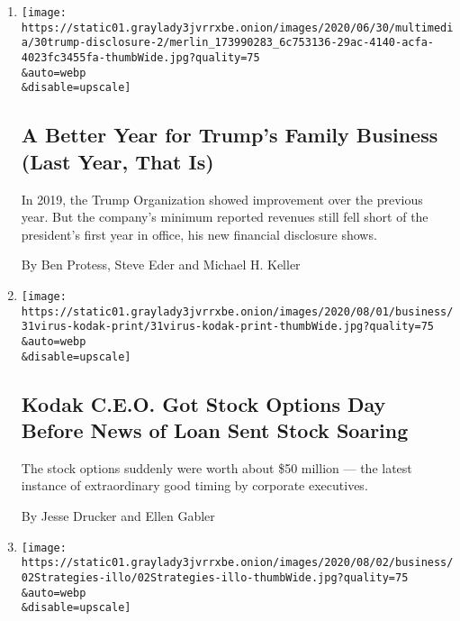 \begin{enumerate}
\def\labelenumi{\arabic{enumi}.}
\item
  \href{/2020/07/31/business/trump-financial-disclosure.html}{}

  \texttt{[image: https://static01.graylady3jvrrxbe.onion/images/2020/06/30/multimedia/30trump-disclosure-2/merlin\_173990283\_6c753136-29ac-4140-acfa-4023fc3455fa-thumbWide.jpg?quality=75\\\&auto=webp\\\&disable=upscale]}

  \hypertarget{a-better-year-for-trumps-family-business-last-year-that-is}{%
  \subsection{A Better Year for Trump's Family Business (Last Year, That
  Is)}\label{a-better-year-for-trumps-family-business-last-year-that-is}}

  In 2019, the Trump Organization showed improvement over the previous
  year. But the company's minimum reported revenues still fell short of
  the president's first year in office, his new financial disclosure
  shows.

  By Ben Protess, Steve Eder and Michael H. Keller
\item
  \href{/2020/07/31/business/kodak-ceo-stock-options.html}{}

  \texttt{[image: https://static01.graylady3jvrrxbe.onion/images/2020/08/01/business/31virus-kodak-print/31virus-kodak-print-thumbWide.jpg?quality=75\\\&auto=webp\\\&disable=upscale]}

  \hypertarget{kodak-ceo-got-stock-options-day-before-news-of-loan-sent-stock-soaring}{%
  \subsection{Kodak C.E.O. Got Stock Options Day Before News of Loan
  Sent Stock
  Soaring}\label{kodak-ceo-got-stock-options-day-before-news-of-loan-sent-stock-soaring}}

  The stock options suddenly were worth about \$50 million --- the
  latest instance of extraordinary good timing by corporate executives.

  By Jesse Drucker and Ellen Gabler
\item
  \href{/2020/07/31/business/mutual-fund-winners-stocks-bonds.html}{}

  \texttt{[image: https://static01.graylady3jvrrxbe.onion/images/2020/08/02/business/02Strategies-illo/02Strategies-illo-thumbWide.jpg?quality=75\\\&auto=webp\\\&disable=upscale]}


\end{enumerate}

